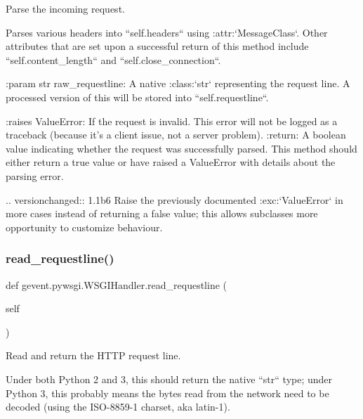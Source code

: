 \begin{DoxyVerb}Parse the incoming request.

Parses various headers into ``self.headers`` using
:attr:`MessageClass`. Other attributes that are set upon a successful
return of this method include ``self.content_length`` and ``self.close_connection``.

:param str raw_requestline: A native :class:`str` representing
   the request line. A processed version of this will be stored
   into ``self.requestline``.

:raises ValueError: If the request is invalid. This error will
   not be logged as a traceback (because it's a client issue, not a server problem).
:return: A boolean value indicating whether the request was successfully parsed.
   This method should either return a true value or have raised a ValueError
   with details about the parsing error.

.. versionchanged:: 1.1b6
   Raise the previously documented :exc:`ValueError` in more cases instead of returning a
   false value; this allows subclasses more opportunity to customize behaviour.
\end{DoxyVerb}
 \mbox{\label{classgevent_1_1pywsgi_1_1_w_s_g_i_handler_ae871abaff811cd62b9f6d101dce8ed47}} 
\subsubsection{\texorpdfstring{read\+\_\+requestline()}{read\_requestline()}}
{\footnotesize\ttfamily def gevent.\+pywsgi.\+W\+S\+G\+I\+Handler.\+read\+\_\+requestline (\begin{DoxyParamCaption}\item[{}]{self }\end{DoxyParamCaption})}

\begin{DoxyVerb}Read and return the HTTP request line.

Under both Python 2 and 3, this should return the native
``str`` type; under Python 3, this probably means the bytes read
from the network need to be decoded (using the ISO-8859-1 charset, aka
latin-1).
\end{DoxyVerb}
 \mbox{\label{classgevent_1_1pywsgi_1_1_w_s_g_i_handler_a92d7db46cfee34e1012de6e20ee3c0ea}} 
